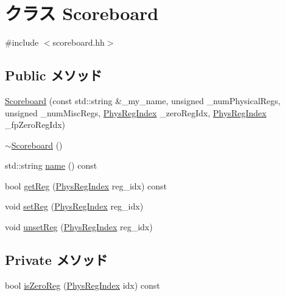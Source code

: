 \hypertarget{classScoreboard}{
\section{クラス Scoreboard}
\label{classScoreboard}
}


{\ttfamily \#include $<$scoreboard.hh$>$}\subsection*{Public メソッド}
\begin{DoxyCompactItemize}
\item 
\hyperlink{classScoreboard_a4ad4a4f708e90ce7482859dd19a04a98}{Scoreboard} (const std::string \&\_\-my\_\-name, unsigned \_\-numPhysicalRegs, unsigned \_\-numMiscRegs, \hyperlink{o3_2comm_8hh_a5ec29599c4bc29a3054c451674969e7b}{PhysRegIndex} \_\-zeroRegIdx, \hyperlink{o3_2comm_8hh_a5ec29599c4bc29a3054c451674969e7b}{PhysRegIndex} \_\-fpZeroRegIdx)
\item 
\hyperlink{classScoreboard_ad2193b96d3a42d5a954f64072cc890c2}{$\sim$Scoreboard} ()
\item 
std::string \hyperlink{classScoreboard_a37627d5d5bba7f4a8690c71c2ab3cb07}{name} () const 
\item 
bool \hyperlink{classScoreboard_acf9440aa48311ccc1f0cf3ad9add8437}{getReg} (\hyperlink{o3_2comm_8hh_a5ec29599c4bc29a3054c451674969e7b}{PhysRegIndex} reg\_\-idx) const 
\item 
void \hyperlink{classScoreboard_abefd2f48474b0ac4510bef8672c8957a}{setReg} (\hyperlink{o3_2comm_8hh_a5ec29599c4bc29a3054c451674969e7b}{PhysRegIndex} reg\_\-idx)
\item 
void \hyperlink{classScoreboard_a69192a05bc6089fef590191f4ca52d11}{unsetReg} (\hyperlink{o3_2comm_8hh_a5ec29599c4bc29a3054c451674969e7b}{PhysRegIndex} reg\_\-idx)
\end{DoxyCompactItemize}
\subsection*{Private メソッド}
\begin{DoxyCompactItemize}
\item 
bool \hyperlink{classScoreboard_ace4f4e3c8b8625f569c7e64a169ce2f1}{isZeroReg} (\hyperlink{o3_2comm_8hh_a5ec29599c4bc29a3054c451674969e7b}{PhysRegIndex} idx) const 
\end{DoxyCompactItemize}
